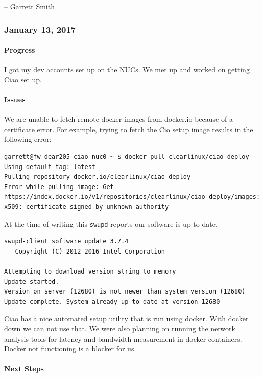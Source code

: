 \documentclass[10pt,onecolumn,journal,draftclsnofoot]{IEEEtran}
\begin{document}
-- Garrett Smith

\subsubsection{January 13, 2017} 

\paragraph{Progress} 

I got my dev accounts set up on the NUCs. We met up and worked on
getting Ciao set up.

\paragraph{Issues} 

We are unable to fetch remote docker images from docker.io because of a
certificate error. For example, trying to fetch the Cio setup image
results in the following error:

\begin{lstlisting}
garrett@fw-dear205-ciao-nuc0 ~ $ docker pull clearlinux/ciao-deploy
Using default tag: latest
Pulling repository docker.io/clearlinux/ciao-deploy
Error while pulling image: Get https://index.docker.io/v1/repositories/clearlinux/ciao-deploy/images: x509: certificate signed by unknown authority
\end{lstlisting}

At the time of writing this \lstinline!swupd! reports our software is up
to date.

\begin{lstlisting}
swupd-client software update 3.7.4
   Copyright (C) 2012-2016 Intel Corporation

Attempting to download version string to memory
Update started.
Version on server (12680) is not newer than system version (12680)
Update complete. System already up-to-date at version 12680
\end{lstlisting}

Ciao has a nice automated setup utility that is run using docker. With
docker down we can not use that. We were also planning on running the
network analysis tools for latency and bandwidth measurement in docker
containers. Docker not functioning is a blocker for us.

\paragraph{Next Steps} 
\end{document}
